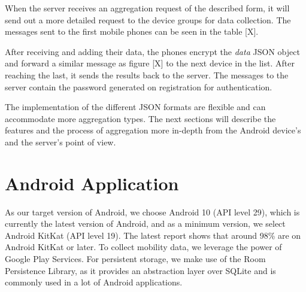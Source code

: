 
When the server receives an aggregation request of the described form, it will send out a more detailed request to the device groups for data collection. The messages sent to the first mobile phones can be seen in the table [X].

After receiving and adding their data, the phones encrypt the \textit{data} JSON object and forward a similar message as figure [X] to the next device in the list. After reaching the last, it sends the results back to the server. The messages to the server contain the password generated on registration for authentication.

The implementation of the different JSON formats are flexible and can accommodate more aggregation types. The next sections will describe the features and the process of aggregation more in-depth from the Android device's and the server's point of view.

\section{Android Application}
As our target version of Android, we choose Android 10 (API level 29), which is currently the latest version of Android, and as a minimum version, we select Android KitKat (API level 19). The latest report shows that around 98\% are on Android KitKat or later. To collect mobility data, we leverage the power of Google Play Services. For persistent storage, we make use of the Room Persistence Library, as it provides an abstraction layer over SQLite and is commonly used in a lot of Android applications.


